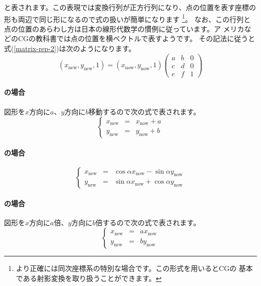 と表されます。この表現では変換行列が正方行列になり、点の位置を表す座標の
形も両辺で同じ形になるので式の扱いが簡単になります
\footnote{より正確には同次座標系の特別な場合です。この形式を用いるとCGの
基本である射影変換を取り扱うことができます。}。
%
なお、この行列と点の位置のあらわし方は日本の線形代数学の慣例に従っています。ア
メリカなどのCGの教科書では点の位置を横ベクトルで表すようです。
その記法に従うと式(\ref{matrix-rep-2})は次のようになります。
\begin{equation}
\left(x_{\mathrm{new}},y_{\mathrm{new}},1\right)
=\left(x_{\mathrm{now}},y_{\mathrm{now}},1\right)
\left(\begin{array}{ccc}a&b&0\\c&d&0\\e&f&1\end{array}\right)
\label{matrix-rep-3}
\end{equation}
\paragraph{の場合}
図形を$x$方向に$a$、$y$方向に$b$移動するので次の式で表されます。
\begin{equation*}
 \left\{\begin{array}{rcl}
 x_{\mathrm{new}} &=&
    x_{\mathrm{now}}+a\\
 y_{\mathrm{new}}  & =&
    y_{\mathrm{now}}+b
	\end{array}\right.
\end{equation*}
\paragraph{の場合}
\begin{equation*}
 \left\{\begin{array}{rcl}
 x_{\mathrm{new}} &=&
    \cos\alpha x_{\mathrm{now}}-\sin \alpha y_{\mathrm{now}}\\
 y_{\mathrm{new}}  & =&
    \sin \alpha  x_{\mathrm{now}}+\cos\alpha y_{\mathrm{now}}
	\end{array}\right.
\end{equation*}
\paragraph{の場合}
図形を$x$方向に$a$倍、$y$方向に$b$倍するので次の式で表されます。
\begin{equation*}
 \left\{\begin{array}{rcl}
 x_{\mathrm{new}} &=& ax_{\mathrm{now}}\\
 y_{\mathrm{new}} &=& by_{\mathrm{now}}
	\end{array}\right.
\end{equation*}

